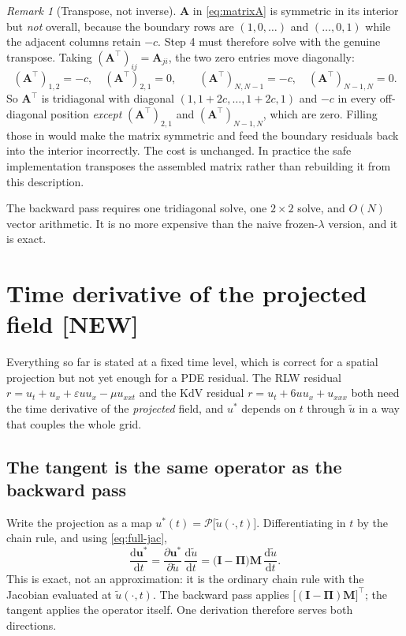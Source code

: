 \documentclass[11pt,a4paper]{article}
\theoremstyle{remark}
\newtheorem{remark}{Remark}
\newcommand{\ut}{\tilde{u}}
\newcommand{\us}{u^{*}}
\begin{document}
\begin{remark}[Transpose, not inverse]
$\bm{A}$ in \eqref{eq:matrixA} is symmetric in its interior but \emph{not}
overall, because the boundary rows are $(1,0,\dots)$ and $(\dots,0,1)$ while the
adjacent columns retain $-c$. Step 4 must therefore solve with the genuine
transpose. Taking $(\bm{A}^\top)_{ij} = \bm{A}_{ji}$, the two zero entries move
diagonally:
\begin{equation}
(\bm{A}^\top)_{1,2} = -c,\quad (\bm{A}^\top)_{2,1} = 0,
\qquad
(\bm{A}^\top)_{N,N-1} = -c,\quad (\bm{A}^\top)_{N-1,N} = 0 .
\end{equation}
So $\bm{A}^\top$ is tridiagonal with diagonal $(1, 1+2c,\dots,1+2c, 1)$ and
$-c$ in every off-diagonal position \emph{except} $(\bm{A}^\top)_{2,1}$ and
$(\bm{A}^\top)_{N-1,N}$, which are zero. Filling those in would make the matrix
symmetric and feed the boundary residuals back into the interior incorrectly.
The cost is unchanged. In practice the safe implementation transposes the
assembled matrix rather than rebuilding it from this description.
\end{remark}

The backward pass requires one tridiagonal solve, one $2\times2$ solve, and
$O(N)$ vector arithmetic. It is no more expensive than the naive frozen-$\lambda$
version, and it is exact.

\section{Time derivative of the projected field \textbf{[NEW]}}
\label{sec:tangent}

Everything so far is stated at a fixed time level, which is correct for a
spatial projection but not yet enough for a PDE residual. The RLW residual
$r = u_t + u_x + \varepsilon uu_x - \mu u_{xxt}$ and the KdV residual
$r = u_t + 6uu_x + u_{xxx}$ both need the time derivative of the
\emph{projected} field, and $\us$ depends on $t$ through $\ut$ in a way that
couples the whole grid.

\subsection{The tangent is the same operator as the backward pass}

Write the projection as a map $\us(t) = \mathcal{P}\big[\ut(\cdot,t)\big]$.
Differentiating in $t$ by the chain rule, and using \eqref{eq:full-jac},
\begin{equation}
\boxed{\
\frac{\mathrm d\bm{\us}}{\mathrm dt}
= \frac{\partial\bm{\us}}{\partial\ut}\,\frac{\mathrm d\ut}{\mathrm dt}
= \big(\bm{I}-\bm\Pi\big)\bm{M}\,\frac{\mathrm d\ut}{\mathrm dt}. \ }
\label{eq:tangent}
\end{equation}
This is exact, not an approximation: it is the ordinary chain rule with the
Jacobian evaluated at $\ut(\cdot,t)$. The backward pass applies
$\big[(\bm I-\bm\Pi)\bm M\big]^\top$; the tangent applies the operator itself.
One derivation therefore serves both directions.
\end{document}
